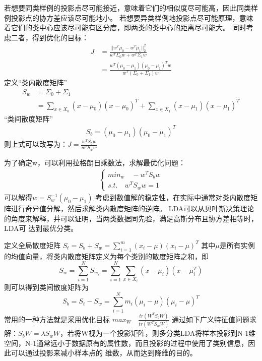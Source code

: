 \documentclass{article}
\begin{document}
若想要同类样例的投影点尽可能接近，意味着它们的相似度尽可能高，因此同类样例投影点的协方差应该尽可能地小。
若想要异类样例地投影点尽可能原理，意味着它们的类中心应该尽可能有区分度，即两类的类中心的距离尽可能大。
同时考虑二者，得到优化的目标：
\begin{align}
    J &= \frac{||w^T{\mu}_0 - w^T{\mu}_1||_2^2}{w^T{\Sigma}_0w+w^T{\Sigma}_1w} \\
    &= \frac{w^T({\mu}_0-{\mu}_1)({\mu}_0-{\mu}_1)^Tw}{w^T({\Sigma}_0+{\Sigma}_1)w}
\end{align}
定义“类内散度矩阵”
\begin{align}
    S_w &= {\Sigma}_0+{\Sigma}_1 \\
    &= {\sum}_{x\in X_0} (x-{\mu}_0)(x-{\mu}_0)^T + {\sum}_{x\in X_1} (x-{\mu}_1)(x-{\mu}_1)^T
\end{align}
“类间散度矩阵”
\begin{align}
    S_b = ({\mu}_0-{\mu}_1)({\mu}_0-{\mu}_1)^T
\end{align}
则上式可以改写为：$J=\frac{w^TS_bw}{w^TS_ww}$

为了确定w，可以利用拉格朗日乘数法，求解最优化问题：
\begin{align*}
    \begin{cases}
        {min}_w \quad -w^TS_bw \\
        s.t. \quad w^TS_ww = 1
    \end{cases}
\end{align*}
可以解得$w=S_w^{-1}({\mu}_0-{\mu}_1)$
考虑到数值解的稳定性，在实际中通常对类内散度矩阵进行奇异值分解，然后求解类内散度矩阵的逆阵。
LDA可以从贝叶斯决策理论的角度来解释，并可以证明，当两类数据同先验，满足高斯分布且协方差相等时，LDA可
达到最优分类。

定义全局散度矩阵
$
S_t = S_b + S_w = {\sum}_{i=1}^m(x_i - \mu)(x_i - \mu)^T
$
其中$\mu$是所有实例的均值向量，将类内散度矩阵定义为每个类别的散度矩阵之和，即
\begin{equation}
    S_w = {\sum}_{i=1}^N S_{w_i} = {\sum}_{i=1}^N {\sum}_{x\in X_i} (x-{\mu}_i)(x-{\mu}_i^T)
\end{equation}
则可以得到类间散度矩阵为
\begin{equation}
    S_b = S_t - S_w = {\sum}_{i=1}^N m_i ({\mu}_i-\mu)({\mu}_i-\mu)^T
\end{equation}
常用的一种方法就是采用优化目标
$
{max}_W \quad \frac{tr(W^TS_bW)}{tr(W^TS_wW)}
$
通过如下广义特征值问题求解：$S_bW={\lambda}S_wW$，若将W视为一个投影矩阵，则多分类LDA将样本投影到N-1维
空间，N-1通常远小于数据原有的属性数，而且投影的过程中使用了类别信息，因此可以通过投影来减小样本点的
维数，从而达到降维的目的。
\end{document}
